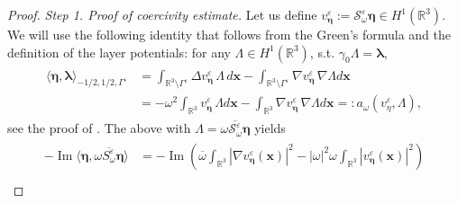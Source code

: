 \documentclass[]{article}
\numberwithin{equation}{section}
\numberwithin{theorem}{section}
\numberwithin{lemma}{section}
\numberwithin{corollary}{section}
\numberwithin{proposition}{section}
\numberwithin{definition}{section}
\newcommand{\mypar}[1]{\noindent\textit{#1}\hspace{0.1em}}
\newcommand{\re}{\varepsilon}
\renewcommand{\vec}{\boldsymbol}
\renewcommand{\Im}{\operatorname{Im}}
\begin{document}
	\begin{proof}
		\mypar{Step 1. Proof of coercivity estimate.}
		Let us define $v^{\re}_{\vec{\eta}} := \mathcal{S}^{\re}_{\omega} \vec{\eta} \in H^1(\mathbb{R}^3)$.
		We will use the following identity that follows from the Green's formula and the definition of the layer potentials: for any $\Lambda\in H^1(\mathbb{R}^3)$, s.t. $\gamma_0 \Lambda=\vec{\lambda}$, 
		\begin{align}
			\label{eq:identity}
			\begin{split}
				\langle \vec{\eta}, \vec{\lambda}\rangle_{-1/2,1/2,\Gamma^{\re}}&=\int_{\mathbb{R}^3\setminus\Gamma^{\re}} \Delta v^{\re}_{\vec{\eta}}\, \Lambda\, d\vec{x}-\int_{\mathbb{R}^3\setminus\Gamma^{\re}} \nabla  v^{\re}_{\vec{\eta}}\,\nabla \Lambda d\vec{x}\\
				&=-\omega^2\int_{\mathbb{R}^3} v^{\re}_{\vec{\eta}}\, \Lambda d\vec{x}-\int_{\mathbb{R}^3} \nabla  v^{\re}_{\vec{\eta}}\,\nabla \Lambda d\vec{x}=:a_{\omega}(v^{\re}_{\eta}, {\Lambda}),
			\end{split}
		\end{align}
		see the proof of \cite[Proposition 2.6.1, after (2.17)]{sayas}. The above with ${\Lambda}= \overline{\omega \mathcal{S}^{\re}_{\omega} \vec{\eta}}$ yields
		\begin{align}
			\label{eq:etaSeta}
			\begin{split}
				-\Im\langle \vec{\eta}, \overline{\omega S^{\re}_{\omega} \vec{\eta}}\rangle 
				&=-\Im \left(\overline{\omega} \int_{\mathbb{R}^3}  |\nabla v^{\re}_{\vec{\eta}} (\boldsymbol{x})|^2  -  |\omega|^2\omega \int_{\mathbb{R}^3} |v^{\re}_{\vec{\eta}}(\boldsymbol{x})|^2\right) \\

\end{split}
\end{align}
\end{proof}
\end{document}
